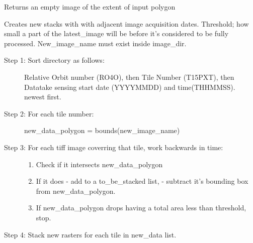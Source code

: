 \documentclass[letterpaper,10pt,english]{sphinxmanual}
\begin{document}

\begin{fulllineitems}
\label{\detokenize{index:pyeo.raster_manipulation.create_new_image_from_polygon}}
Returns an empty image of the extent of input polygon

\end{fulllineitems}


\begin{fulllineitems}
\label{\detokenize{index:pyeo.raster_manipulation.create_new_stacks}}
Creates new stacks with with adjacent image acquisition dates. Threshold; how small a part
of the latest\_image will be before it’s considered to be fully processed.
New\_image\_name must exist inside image\_dir.
\begin{description}
\item[{Step 1: Sort directory as follows:}] \leavevmode
Relative Orbit number (RO4O), then Tile Number (T15PXT), then
Datatake sensing start date (YYYYMMDD) and time(THHMMSS).
newest first.

\item[{Step 2: For each tile number:}] \leavevmode
new\_data\_polygon = bounds(new\_image\_name)

\item[{Step 3: For each tiff image coverring that tile, work backwards in time:}] \leavevmode\begin{enumerate}
\def\theenumi{\alph{enumi}}
\def\labelenumi{\theenumi .}
\makeatletter\def\p@enumii{\p@enumi \theenumi .}\makeatother
\item {} 
Check if it intersects new\_data\_polygon

\item {} 
If it does
- add to a to\_be\_stacked list,
- subtract it’s bounding box from new\_data\_polygon.

\item {} 
If new\_data\_polygon drops having a total area less than threshold, stop.

\end{enumerate}

\end{description}

Step 4: Stack new rasters for each tile in new\_data list.

\end{fulllineitems}
\end{document}

